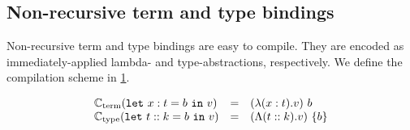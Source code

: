 \subsection{Non-recursive term and type bindings}
\label{sec:non-recursive-terms}

Non-recursive term and type bindings are easy to compile.
They are encoded as immediately-applied lambda- and type-abstractions,
respectively. We define the compilation scheme in \cref{fig:compile-nonrecursive-terms}.

\begin{figure}[!t]
  \centering
  \begin{displaymath}
  \begin{array}{lll}
  \mathbb{C}_{\mathrm{term}}(\operatorname{\texttt{let}}\, x : t = b\, \operatorname{\texttt{in}}\, v) &=& (\lambda (x : t) . v)\ b\\
  \mathbb{C}_{\mathrm{type}}(\operatorname{\texttt{let}}\, t :: k = b\, \operatorname{\texttt{in}}\, v) &=& (\Lambda (t :: k) . v)\ \{b\}
  \end{array}
  \end{displaymath}

  \label{fig:compile-nonrecursive-terms}
\end{figure}
